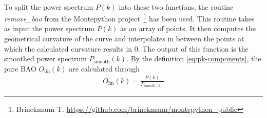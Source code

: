  \\
 To split the power spectrum $P(k)$ into these two functions, the routine \textit{remove\_bao} from the Montepython project~\footnote{Brinckmann T. \url{https://github.com/brinckmann/montepython_public}} has been used. This routine takes as input the power spectrum $P(k)$ as an array of points. It then computes the geometrical curvature of the curve and interpolates in between the points at which the calculated curvature results in 0. The output of this function is the smoothed power spectrum $P_{\text{smooth}}(k)$. By the definition \eqref{eq:pk-components}, the pure BAO  $O_{\text{lin}}(k)$ are calculated through 
\begin{align}
	O_{\text{lin}}(k) = \frac{P(k)}{P_{\text{smooth}(k)}}
\end{align}

